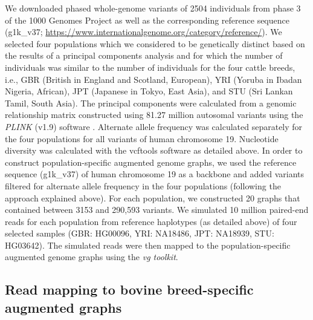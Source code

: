 \documentclass[../main.tex]{subfiles}
\begin{document}
We downloaded phased whole-genome variants of 2504 individuals from phase 3 of the 1000 Genomes Project \citep{10002015global} as well as the corresponding reference sequence (g1k\_v37; \url{https://www.internationalgenome.org/category/reference/}). We selected four populations which we considered to be genetically distinct based on the results of a principal components analysis and for which the number of individuals was similar to the number of individuals for the four cattle breeds, i.e., GBR (British in England and Scotland, European), YRI (Yoruba in Ibadan Nigeria, African), JPT (Japanese in Tokyo, East Asia), and STU (Sri Lankan Tamil, South Asia). The principal components were calculated from a genomic relationship matrix constructed using 81.27 million autosomal variants using the \emph{PLINK} (v1.9) software \citep{chang2015second}. Alternate allele frequency was calculated separately for the four populations for all variants of human chromosome 19. Nucleotide diversity was calculated with the vcftools software as detailed above. In order to construct population-specific augmented genome graphs, we used the reference sequence (g1k\_v37) of human chromosome 19 as a backbone and added variants filtered for alternate allele frequency in the four populations (following the approach explained above). For each population, we constructed 20 graphs that contained between 3153 and 290,593 variants. We simulated 10 million paired-end reads for each population from reference haplotypes (as detailed above) of four selected samples (GBR: HG00096, YRI: NA18486, JPT: NA18939, STU: HG03642). The simulated reads were then mapped to the population-specific augmented genome graphs using the \emph{vg toolkit}.

\subsection*{Read mapping to bovine breed-specific augmented graphs}
\end{document}
